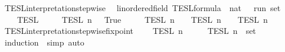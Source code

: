 \begin{isabellebody}
\isamarkupfalse%
\ TESL{\isacharunderscore}interpretation{\isacharunderscore}stepwise\isanewline
\ \ {\isacharcolon}{\isacharcolon}{\isacartoucheopen}{\isacharprime}{\isasymtau}{\isacharcolon}{\isacharcolon}linordered{\isacharunderscore}field\ TESL{\isacharunderscore}formula\ {\isasymRightarrow}\ nat\ {\isasymRightarrow}\ {\isacharprime}{\isasymtau}\ run\ set{\isacartoucheclose}\isanewline
\ \ {\isacharparenleft}{\isacartoucheopen}{\isasymlbrakk}{\isasymlbrakk}\ {\isacharunderscore}\ {\isasymrbrakk}{\isasymrbrakk}\isactrlsub T\isactrlsub E\isactrlsub S\isactrlsub L\isactrlbsup {\isasymge}\ {\isacharunderscore}\isactrlesup {\isacartoucheclose}{\isacharparenright}\isanewline
{}\isanewline
\ \ {\isacartoucheopen}{\isasymlbrakk}{\isasymlbrakk}\ {\isacharbrackleft}{\isacharbrackright}\ {\isasymrbrakk}{\isasymrbrakk}\isactrlsub T\isactrlsub E\isactrlsub S\isactrlsub L\isactrlbsup {\isasymge}\ n\isactrlesup \ {\isacharequal}\ {\isacharbraceleft}{\isasymrho}{\isachardot}\ True{\isacharbraceright}{\isacartoucheclose}\isanewline
{\isacharbar}\ {\isacartoucheopen}{\isasymlbrakk}{\isasymlbrakk}\ {\isasymphi}\ {\isacharhash}\ {\isasymPhi}\ {\isasymrbrakk}{\isasymrbrakk}\isactrlsub T\isactrlsub E\isactrlsub S\isactrlsub L\isactrlbsup {\isasymge}\ n\isactrlesup \ {\isacharequal}\ {\isasymlbrakk}\ {\isasymphi}\ {\isasymrbrakk}\isactrlsub T\isactrlsub E\isactrlsub S\isactrlsub L\isactrlbsup {\isasymge}\ n\isactrlesup \ {\isasyminter}\ {\isasymlbrakk}{\isasymlbrakk}\ {\isasymPhi}\ {\isasymrbrakk}{\isasymrbrakk}\isactrlsub T\isactrlsub E\isactrlsub S\isactrlsub L\isactrlbsup {\isasymge}\ n\isactrlesup {\isacartoucheclose}\isanewline
\isanewline
{}\isamarkupfalse%
\ TESL{\isacharunderscore}interpretation{\isacharunderscore}stepwise{\isacharunderscore}fixpoint{\isacharcolon}\isanewline
\ \ {\isacartoucheopen}{\isasymlbrakk}{\isasymlbrakk}\ {\isasymPhi}\ {\isasymrbrakk}{\isasymrbrakk}\isactrlsub T\isactrlsub E\isactrlsub S\isactrlsub L\isactrlbsup {\isasymge}\ n\isactrlesup \ {\isacharequal}\ {\isasymInter}\ {\isacharparenleft}{\isacharparenleft}{\isasymlambda}{\isasymphi}{\isachardot}\ {\isasymlbrakk}\ {\isasymphi}\ {\isasymrbrakk}\isactrlsub T\isactrlsub E\isactrlsub S\isactrlsub L\isactrlbsup {\isasymge}\ n\isactrlesup {\isacharparenright}\ {\isacharbackquote}\ set\ {\isasymPhi}{\isacharparenright}{\isacartoucheclose}\isanewline
%
\isadelimproof
%
\endisadelimproof
%
\isatagproof
{}\isamarkupfalse%
\ {\isacharparenleft}induction\ {\isasymPhi}{\isacharcomma}\ simp{\isacharcomma}\ auto{\isacharparenright}%
\endisatagproof

\end{isabellebody}
